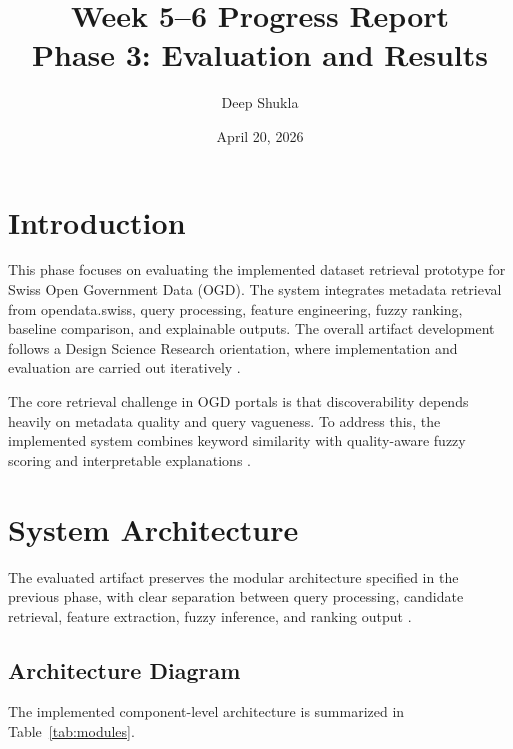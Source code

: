 \documentclass[11pt,a4paper]{article}
\title{Week 5--6 Progress Report\\Phase 3: Evaluation and Results}
\author{Deep Shukla}
\date{April 20, 2026}
\begin{document}
\maketitle

\section{Introduction}

This phase focuses on evaluating the implemented dataset retrieval prototype for Swiss Open Government Data (OGD). The system integrates metadata retrieval from opendata.swiss, query processing, feature engineering, fuzzy ranking, baseline comparison, and explainable outputs. The overall artifact development follows a Design Science Research orientation, where implementation and evaluation are carried out iteratively \citep{hevner2004,peffers2007,thesisPhase2_2026}.

The core retrieval challenge in OGD portals is that discoverability depends heavily on metadata quality and query vagueness. To address this, the implemented system combines keyword similarity with quality-aware fuzzy scoring and interpretable explanations \citep{janssen2012,attard2015,zadeh1965,mamdani1974,doshi2017}.

\section{System Architecture}

The evaluated artifact preserves the modular architecture specified in the previous phase, with clear separation between query processing, candidate retrieval, feature extraction, fuzzy inference, and ranking output \citep{thesisPhase2_2026}.

\subsection{Architecture Diagram}

The implemented component-level architecture is summarized in Table~\ref{tab:modules}.
\end{document}
